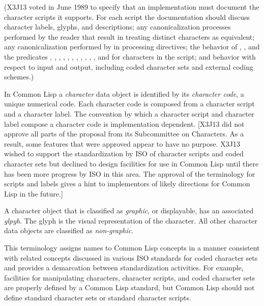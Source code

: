 \begin{newer}
(X3J13 voted in June 1989  to specify that
an implementation must document the character scripts it supports.
For each script the documentation should discuss character labels,
glyphs, and descriptions; any canonicalization processes performed
by the reader that result in treating distinct characters as equivalent;
any canonicalization performed by  in processing directives;
the behavior of , , and the predicates
, , , ,
, , , ,
, , , and 
for characters in the script; and behavior with respect to input and output,
including coded character sets and external coding schemes.)

In Common Lisp a {\it character} data object is identified by its {\it character code},
a unique numerical code.  Each character code is composed from a character script
and a character label.  The convention by which a character script and
character label compose a character code is implementation dependent.
[X3J13 did not approve all parts of the proposal from its Subcommittee
on Characters.  As a result, some features that were approved appear to
have no purpose.  X3J13 wished to support the standardization by ISO of character
scripts and coded character sets but declined to design facilities for use in
Common Lisp until there has been more progress by ISO in this area.
The approval of the terminology for scripts and labels gives a hint
to implementors of likely directions for Common Lisp in the future.]

A character object that is classified as {\it graphic}, or displayable,
has an associated {\it glpyh}.  The glyph is the visual representation
of the character.  All other character data objects are classified as
{\it non-graphic}.

This terminology assigns names to Common Lisp concepts
in a manner consistent with
related concepts discussed in various ISO standards for coded
character sets and provides a demarcation between standardization
activities.  For example, facilities for manipulating characters,
character scripts, and coded character sets are properly defined
by a Common Lisp standard, but Common Lisp should not define
standard character sets or standard character scripts.
\end{newer}

